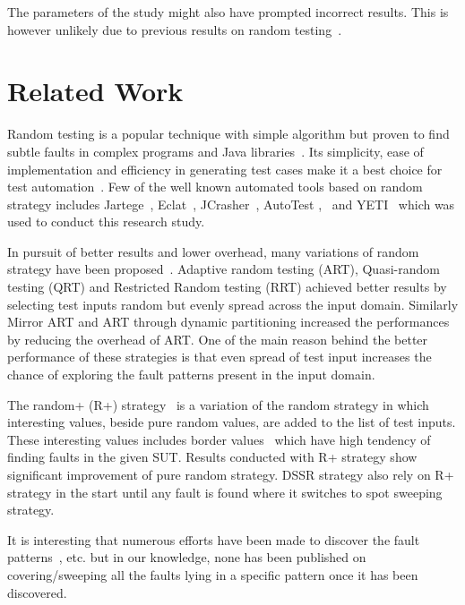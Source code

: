 \documentclass{acm_proc_article-sp}
\begin{document}
The parameters of the study might also have prompted incorrect results. This is however unlikely due to previous results on random testing~\cite{Oriol2012}.




\section{Related Work}\label{sec:rw}

Random testing is a popular technique with simple algorithm but proven to find subtle faults in complex programs and Java libraries~\cite{Pacheco2005, Csallner2004, Claessen2000a}. Its simplicity, ease of implementation and efficiency in generating test cases make it a best choice for test automation~\cite{Hamlet1994}. Few of the well known automated tools based on random strategy includes Jartege~\cite{Oriat2004}, Eclat~\cite{Pacheco2005}, JCrasher~\cite{Csallner2004}, AutoTest \cite{Ciupa2007},~\cite{Ciupa2008a} and YETI~\cite{Oriol2010, Oriol2012}  which was used to conduct this research study.

In pursuit of better results and lower overhead, many variations of random strategy have been proposed~\cite{Chen2010, Chen2005, Chan2002, Chen2004a, Chen2003}. Adaptive random testing (ART), Quasi-random testing (QRT) and Restricted Random testing (RRT) achieved better results by selecting test inputs random but evenly spread across the input domain. Similarly Mirror ART and ART through dynamic partitioning increased the performances by reducing the overhead of ART. One of the main reason behind the better performance of these strategies is that even spread of test input increases the chance of exploring the fault patterns present in the input domain.
 
The random+ (R+) strategy~\cite{Leitner2007} is a variation of the random strategy in which interesting values, beside pure random values, are added to the list of test inputs. These interesting values includes border values~\cite{Beizer1990} which have high tendency of finding faults in the given SUT. Results conducted with R+ strategy show significant improvement of pure random strategy. DSSR strategy also rely on R+ strategy in the start until any fault is found where it switches to spot sweeping strategy.

It is interesting that numerous efforts have been made to discover the fault patterns~\cite{Chen2010, Chen2005, Chan2002, Chen2004a, Chen2003}, etc. but in our knowledge, none has been published on covering/sweeping all the faults lying in a specific pattern once it has been discovered.
\end{document}
